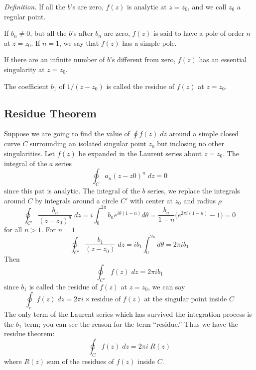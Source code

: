 \documentclass[../../../main.tex]{subfiles}
\begin{document}
\emph{Definition.} If all the $b$’s are zero, $f (z)$ is analytic at $z = z_0$, and we call $z_0$ a regular point.

If $b_n \neq 0$, but all the $b$’s after $b_n$ are zero, $f (z)$ is said to have a pole of order $n$ at $z = z_0$. If $n = 1$, we say that $f (z)$ has a simple pole.

If there are an infinite number of $b$’s different from zero, $f (z)$ has an essential singularity at $z = z_0$.

The coefficient $b_1$ of $1/(z - z_0)$ is called the residue of $f (z)$ at $z = z_0$.

\subsection{Residue Theorem}
Suppose we are going to find the value of $\oint  f (z) \;dz$ around a simple closed curve $C$ surrounding an isolated singular point $z_0$ but inclosing no other singularities. Let $f (z)$ be expanded in the Laurent series about $z = z_0$. The integral of the $a$ series 
\begin{equation*}
    \oint_C a_n(z-z0)^n\;dz=0
\end{equation*}
since this pat is analytic. The integral of the $b$ series, we replace the integrals around $C$ by integrals around a circle $C'$ with center at $z_0$ and radius $\rho$
\begin{equation*}
    \oint_{C'} \frac{b_n}{(z-z_0)^n}\;dz=i\int_{0}^{2\pi}b_ne^{i\theta(1-n)}d\theta=\frac{b_n}{1-n}\biggl(e^{2\pi i (1-n)}-1\biggr)=0
\end{equation*}
for all $n>1$. For $n=1$
\begin{equation*}
    \oint_{C'} \frac{b_1}{(z-z_0)}\;dz=ib_1\int_{0}^{2\pi}d\theta=2\pi i b_1
\end{equation*}
Then
\begin{equation*}
    \oint_{C'}  f (z) \;dz=2\pi i b_1
\end{equation*}
since $b_1$ is called the residue of $f (z)$ at $z = z_0$, we can say
\begin{equation*}
    \oint_c  f (z) \;dz=2\pi i \times \text{residue of $f (z)$ at the singular point inside $C$}
\end{equation*}
The only term of the Laurent series which has survived the integration process is the $b_1$ term; you can see the reason for the term “residue.” Thus we have the residue theorem:
\begin{equation*}
    \oint_C  f (z) \;dz=2\pi i\; R(z)
\end{equation*}
where $R(z)$ sum of the residues of $f (z)$ inside $C$.
\end{document}
